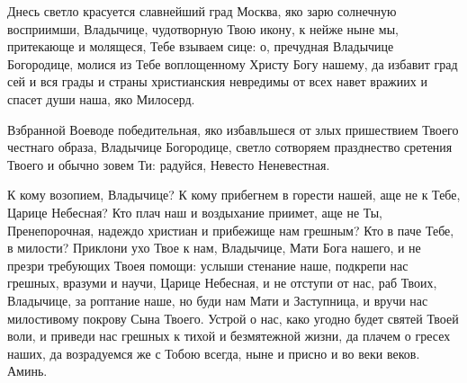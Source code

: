 
\begin{mymulticols}



Днесь светло красуется славнейший град Москва, яко зарю солнечную восприимши, Владычице, чудотворную Твою икону, к нейже ныне мы, притекающе и молящеся, Тебе взываем сице: о, пречудная Владычице Богородице, молися из Тебе воплощенному Христу Богу нашему, да избавит град сей и вся грады и страны христианския невредимы от всех навет вражиих и спасет души наша, яко Милосерд.


Взбранной Воеводе победительная, яко избавльшеся от злых пришествием Твоего честнаго образа, Владычице Богородице, светло сотворяем празднество сретения Твоего и обычно зовем Ти: радуйся, Невесто Неневестная.


К кому возопием, Владычице? К кому прибегнем в горести нашей, аще не к Тебе, Царице Небесная? Кто плач наш и воздыхание приимет, аще не Ты, Пренепорочная, надеждо христиан и прибежище нам грешным? Кто в паче Тебе, в милости? Приклони ухо Твое к нам, Владычице, Мати Бога нашего, и не презри требующих Твоея помощи: услыши стенание наше, подкрепи нас грешных, вразуми и научи, Царице Небесная, и не отступи от нас, раб Твоих, Владычице, за роптание наше, но буди нам Мати и Заступница, и вручи нас милостивому покрову Сына Твоего. Устрой о нас, како угодно будет святей Твоей воли, и приведи нас грешных к тихой и безмятежной жизни, да плачем о гресех наших, да возрадуемся же с Тобою всегда, ныне и присно и во веки веков. Аминь.

\end{mymulticols}

\mychapterending

